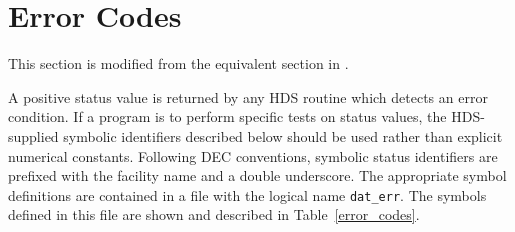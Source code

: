 \clearpage           
\section {Error Codes}

This section is modified from the equivalent section in \cite{sun_92}.

A positive status value is returned by any HDS routine which detects an error
condition. If a program is to perform specific tests on status values, the
HDS-supplied symbolic identifiers described below should be used rather than
explicit numerical constants. Following DEC conventions, symbolic status
identifiers are prefixed with the facility name and a double underscore. The
appropriate symbol definitions are contained in a file with the logical name
{\tt dat\_err}. The symbols defined in this file are shown and described in
Table~\ref{error_codes}.

